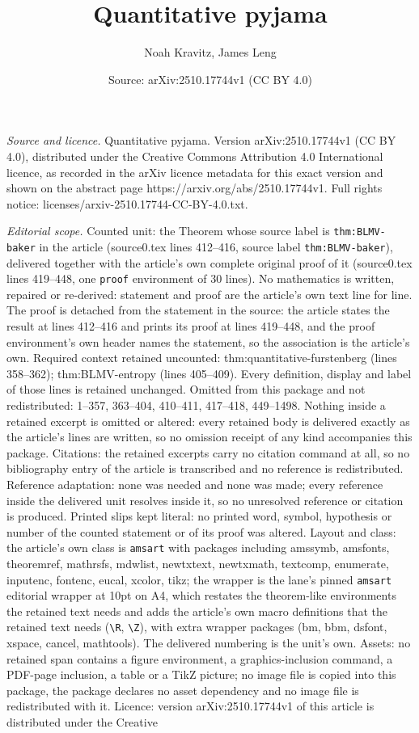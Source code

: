 \documentclass[10pt,a4paper]{amsart}
\title[Quantitative pyjama]{Quantitative pyjama}
\author{Noah Kravitz, James Leng}
\date{Source: arXiv:2510.17744v1 (CC BY 4.0)}
\begin{document}
\maketitle

\noindent\emph{Source and licence.} Quantitative pyjama. Version arXiv:2510.17744v1 (CC BY 4.0), distributed under the Creative Commons Attribution 4.0 International licence, as recorded in the arXiv licence metadata for this exact version and shown on the abstract page https://arxiv.org/abs/2510.17744v1. Full rights notice: licenses/arxiv-2510.17744-CC-BY-4.0.txt.\par\smallskip

\noindent\textit{Editorial scope.} Counted unit: the Theorem whose source label is \texttt{thm:BLMV-baker} in the article (source0.tex lines 412--416, source label \texttt{thm:BLMV-baker}), delivered together with the article's own complete original proof of it (source0.tex lines 419--448, one \texttt{proof} environment of 30 lines). No mathematics is written, repaired or re-derived: statement and proof are the article's own text line for line. The proof is detached from the statement in the source: the article states the result at lines 412--416 and prints its proof at lines 419--448, and the proof environment's own header names the statement, so the association is the article's own. Required context retained uncounted: thm:quantitative-furstenberg (lines 358--362); thm:BLMV-entropy (lines 405--409). Every definition, display and label of those lines is retained unchanged. Omitted from this package and not redistributed: 1--357, 363--404, 410--411, 417--418, 449--1498. Nothing inside a retained excerpt is omitted or altered: every retained body is delivered exactly as the article's lines are written, so no omission receipt of any kind accompanies this package. Citations: the retained excerpts carry no citation command at all, so no bibliography entry of the article is transcribed and no reference is redistributed. Reference adaptation: none was needed and none was made; every reference inside the delivered unit resolves inside it, so no unresolved reference or citation is produced. Printed slips kept literal: no printed word, symbol, hypothesis or number of the counted statement or of its proof was altered. Layout and class: the article's own class is \texttt{amsart} with packages including amssymb, amsfonts, theoremref, mathrsfs, mdwlist, newtxtext, newtxmath, textcomp, enumerate, inputenc, fontenc, eucal, xcolor, tikz; the wrapper is the lane's pinned \texttt{amsart} editorial wrapper at 10pt on A4, which restates the theorem-like environments the retained text needs and adds the article's own macro definitions that the retained text needs (\texttt{\textbackslash R}, \texttt{\textbackslash Z}), with extra wrapper packages (bm, bbm, dsfont, xspace, cancel, mathtools). The delivered numbering is the unit's own. Assets: no retained span contains a figure environment, a graphics-inclusion command, a PDF-page inclusion, a table or a TikZ picture; no image file is copied into this package, the package declares no asset dependency and no image file is redistributed with it. Licence: version arXiv:2510.17744v1 of this article is distributed under the Creative 
\end{document}
